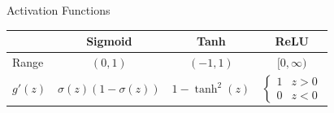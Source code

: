 \documentclass[aspectratio=169,11pt]{beamer}
\begin{document}
\begin{frame}{Activation Functions}
\vspace{-0.1cm}
\begin{center}
\begin{small}
\begin{tabular}{lccc}
\toprule
& \textbf{Sigmoid} & \textbf{Tanh} & \textbf{ReLU} \\
\midrule
Range & $(0,1)$ & $(-1,1)$ & $[0,\infty)$ \\
$g'(z)$ & $\sigma(z)(1-\sigma(z))$ & $1 - \tanh^2(z)$ & $\begin{cases}1&z>0\\0&z<0\end{cases}$ \\
\bottomrule
\end{tabular}
\end{small}
\end{center}
\end{frame}
\end{document}
